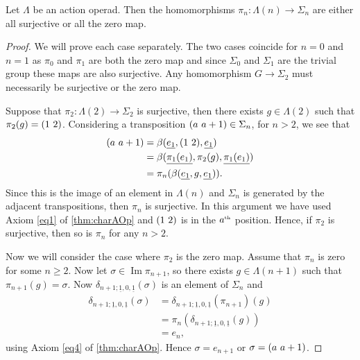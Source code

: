 \begin{prop}\label{surjortriv} Let $\Lambda$ be an action operad. Then the homomorphisms $\pi_n \colon \Lambda(n) \rightarrow \Sigma_n$ are either all surjective or all the zero map.
\end{prop}
\begin{proof}
We will prove each case separately. The two cases coincide for $n = 0$ and $n = 1$ as $\pi_0$ and $\pi_1$ are both the zero map and since $\Sigma_0$ and $\Sigma_1$ are the trivial group these maps are also surjective. Any homomorphism $G \rightarrow \Sigma_2$ must necessarily be surjective or the zero map.

Suppose that $\pi_2 \colon \Lambda(2) \rightarrow \Sigma_2$ is surjective, then there exists $g \in \Lambda(2)$ such that $\pi_2(g) = ( 1 \, \, 2 )$. Considering a transposition $( a \, \, a+1 ) \in \Sigma_n$, for $n > 2$, we see that
  \begin{align*}
      ( a \, \, a+1 ) &= \beta(\underline{e_1},( 1 \, \, 2 ),\underline{e_1}) \\ &= \beta(\underline{\pi_1(e_1)},\pi_2(g),\underline{\pi_1(e_1)}) \\
      &= \pi_n(\beta(\underline{e_1},g,\underline{e_1})).
  \end{align*}
Since this is the image of an element in $\Lambda(n)$ and $\Sigma_n$ is generated by the adjacent transpositions, then $\pi_n$ is surjective. In this argument we have used Axiom \ref{eq1} of \ref{thm:charAOp} and $( 1 \, \, 2 )$ is in the $a^\text{\tiny th}$ position.
Hence, if $\pi_2$ is surjective, then so is $\pi_n$ for any $n > 2$.

Now we will consider the case where $\pi_2$ is the zero map. Assume that $\pi_n$ is zero for some $n \geq 2$. Now let $\sigma \in \operatorname{Im} \pi_{n+1}$, so there exists $g \in \Lambda(n+1)$ such that $\pi_{n+1}(g) = \sigma$. Now $\delta_{n+1;\underline{1},0,\underline{1}}(\sigma)$ is an element of $\Sigma_n$ and
  \begin{align*}
    \delta_{n+1;\underline{1},0,\underline{1}}(\sigma) &= \delta_{n+1;\underline{1},0,\underline{1}}(\pi_{n+1})(g) \\
    &= \pi_n(\delta_{n+1;\underline{1},0,\underline{1}}(g)) \\
    &= e_n,
  \end{align*}
using Axiom \ref{eq4} of \ref{thm:charAOp}. Hence $\sigma = e_{n+1}$ or $\sigma = ( a \, \, a+1 )$.


\end{proof}

